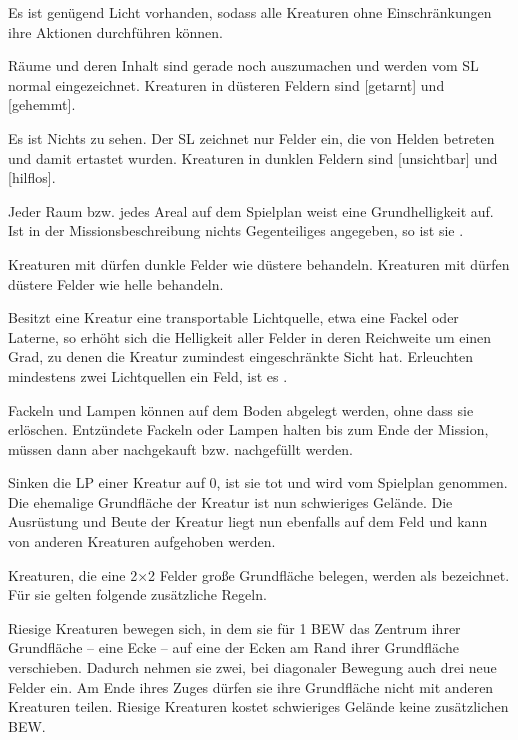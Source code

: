 {		 Es ist genügend Licht vorhanden, sodass alle Kreaturen ohne Einschränkungen ihre Aktionen durchführen können.

		 Räume und deren Inhalt sind gerade noch auszumachen und werden vom SL normal eingezeichnet. Kreaturen in düsteren Feldern sind [getarnt] und [gehemmt].

		 Es ist Nichts zu sehen. Der SL zeichnet nur Felder ein, die von Helden betreten und damit ertastet wurden. Kreaturen in dunklen Feldern sind [unsichtbar] und [hilflos].

		Jeder Raum bzw. jedes Areal auf dem Spielplan weist eine Grundhelligkeit auf. Ist in der Missionsbeschreibung nichts Gegenteiliges angegeben, so ist sie .

		Kreaturen mit  dürfen dunkle Felder wie düstere behandeln. Kreaturen mit  dürfen düstere Felder wie helle behandeln.

			Besitzt eine Kreatur eine transportable Lichtquelle, etwa eine Fackel oder Laterne, so erhöht sich die Helligkeit aller Felder in deren Reichweite um einen Grad, zu denen die Kreatur zumindest eingeschränkte Sicht hat. Erleuchten mindestens zwei Lichtquellen ein Feld, ist es .

			Fackeln und Lampen können auf dem Boden abgelegt werden, ohne dass sie erlöschen. Entzündete Fackeln oder Lampen halten bis zum Ende der Mission, müssen dann aber nachgekauft bzw. nachgefüllt werden.

		Sinken die LP einer Kreatur auf 0, ist sie tot und wird vom Spielplan genommen. Die ehemalige Grundfläche der Kreatur ist nun schwieriges Gelände. Die Ausrüstung und Beute der Kreatur liegt nun ebenfalls auf dem Feld und kann von anderen Kreaturen aufgehoben werden.

		Kreaturen, die eine 2×2 Felder große Grundfläche belegen, werden als  bezeichnet. Für sie gelten folgende zusätzliche Regeln.

		 Riesige Kreaturen bewegen sich, in dem sie für 1 BEW das Zentrum ihrer Grundfläche -- eine Ecke -- auf eine der Ecken am Rand ihrer Grundfläche verschieben. Dadurch nehmen sie zwei, bei diagonaler Bewegung auch drei neue Felder ein. Am Ende ihres Zuges dürfen sie ihre Grundfläche nicht mit anderen Kreaturen teilen. Riesige Kreaturen kostet schwieriges Gelände keine zusätzlichen BEW.

}

